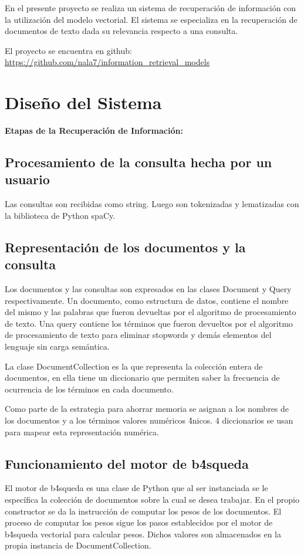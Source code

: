 \documentclass[runningheads,a4paper]{llncs}
\begin{document}
En el presente proyecto se realiza un sistema de recuperaci\'on de informaci\'on con la utilizaci\'on del modelo vectorial.
El sistema se especializa en la recuperaci\'on de documentos de texto dada su relevancia respecto a una consulta.

El proyecto se encuentra en github: \url{https://github.com/nala7/information_retrieval_models}

\section{Diseño del Sistema}\label{sec:diseño-del-sistema}
\textbf{Etapas de la Recuperaci\'on de Informaci\'on:}

\subsection{Procesamiento de la consulta hecha por un usuario}\label{subsec:procesamiento-de-la-consulta-hecha-por-un-usuario}
Las consultas son recibidas como string.
Luego son tokenizadas y lematizadas con la biblioteca de Python spaCy.

\subsection{Representaci\'on de los documentos y la consulta}\label{subsec:representaci\'on-de-los-documentos-y-la-consulta}
Los documentos y las consultas son expresados en las clases Document y Query respectivamente.
Un documento, como estructura de datos, contiene el nombre del mismo y las palabras que fueron devueltas por el algoritmo de procesamiento de texto.
Una query contiene los t\'erminos que fueron devueltos por el algoritmo de procesamiento de texto para eliminar stopwords y dem\'as elementos del lenguaje sin carga sem\'antica.

La clase DocumentCollection es la que representa la colecci\'on entera de documentos, en ella tiene un diccionario que permiten saber la frecuencia de ocurrencia de los t\'erminos en cada documento.

Como parte de la estrategia para ahorrar memoria se asignan a los nombres de los documentos y a los t\'erminos valores num\'ericos \'4nicos.
4 diccionarios se usan para mapear esta representaci\'on num\'erica.
\subsection{Funcionamiento del motor de b\'4squeda}\label{subsec:funcionamiento-del-motor-de-b\'4squeda}
El motor de b\'4squeda es una clase de Python que al ser instanciada se le espec\'ifica la colecci\'on de documentos sobre la cual se desea trabajar.
En el propio constructor se da la instrucci\'on de computar los pesos de los documentos.
El proceso de computar los pesos sigue los pasos establecidos por el motor de b\'4squeda vectorial para calcular pesos.
Dichos valores son almacenados en la propia instancia de DocumentCollection.
\end{document}
